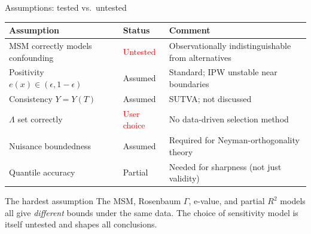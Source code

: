 \documentclass[aspectratio=169]{beamer}
\begin{document}
\begin{frame}{Assumptions: tested vs.\ untested}

\small
\begin{tabular}{p{3.8cm}p{2.2cm}p{4.2cm}}
\toprule
\textbf{Assumption} & \textbf{Status} & \textbf{Comment} \\
\midrule
MSM correctly models confounding & \textcolor{red}{Untested} & Observationally indistinguishable from alternatives \\
Positivity $e(x)\!\in\!(\epsilon,1{-}\epsilon)$ & Assumed & Standard; IPW unstable near boundaries \\
Consistency $Y=Y(T)$ & Assumed & SUTVA; not discussed \\
$\Lambda$ set correctly & \textcolor{red}{User choice} & No data-driven selection method \\
Nuisance boundedness & Assumed & Required for Neyman-orthogonality theory \\
Quantile accuracy & Partial & Needed for sharpness (not just validity) \\
\bottomrule
\end{tabular}
\normalsize

\smallskip
\begin{block}{The hardest assumption}
\small The MSM, Rosenbaum $\Gamma$, e-value, and partial $R^2$ models all give \emph{different} bounds under the same data. The choice of sensitivity model is itself untested and shapes all conclusions.
\end{block}
\end{frame}

\end{document}

